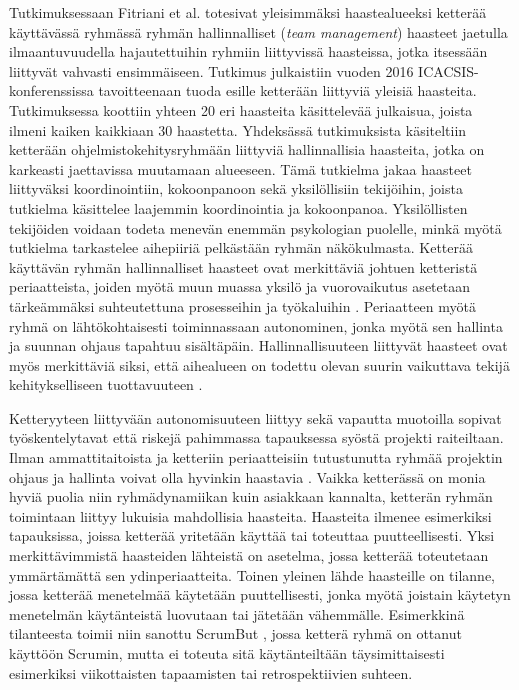 Tutkimuksessaan Fitriani et al. \cite{7872736} totesivat yleisimmäksi haastealueeksi ketterää käyttävässä ryhmässä ryhmän hallinnalliset (\textit{team management}) haasteet jaetulla ilmaantuvuudella hajautettuihin ryhmiin liittyvissä haasteissa, jotka itsessään liittyvät vahvasti ensimmäiseen. Tutkimus julkaistiin vuoden 2016 ICACSIS-konferenssissa tavoitteenaan tuoda esille ketterään liittyviä yleisiä haasteita. Tutkimuksessa koottiin yhteen 20 eri haasteita käsittelevää julkaisua, joista ilmeni kaiken kaikkiaan 30 haastetta. Yhdeksässä tutkimuksista käsiteltiin ketterään ohjelmistokehitysryhmään liittyviä hallinnallisia haasteita, jotka on karkeasti jaettavissa muutamaan alueeseen. Tämä tutkielma jakaa haasteet liittyväksi koordinointiin, kokoonpanoon sekä yksilöllisiin tekijöihin, joista tutkielma käsittelee laajemmin koordinointia ja kokoonpanoa. Yksilöllisten tekijöiden voidaan todeta menevän enemmän psykologian puolelle, minkä myötä tutkielma tarkastelee aihepiiriä pelkästään ryhmän näkökulmasta. Ketterää käyttävän ryhmän hallinnalliset haasteet ovat merkittäviä johtuen ketteristä periaatteista, joiden myötä muun muassa yksilö ja vuorovaikutus asetetaan tärkeämmäksi suhteutettuna prosesseihin ja työkaluihin \cite{beck2001agile}. Periaatteen myötä ryhmä on lähtökohtaisesti toiminnassaan autonominen, jonka myötä sen hallinta ja suunnan ohjaus tapahtuu sisältäpäin. Hallinnallisuuteen liittyvät haasteet ovat myös merkittäviä siksi, että aihealueen on todettu olevan suurin vaikuttava tekijä kehitykselliseen tuottavuuteen \cite{DEOMELO2013412}.

Ketteryyteen liittyvään autonomisuuteen liittyy sekä vapautta muotoilla sopivat työskentelytavat että riskejä pahimmassa tapauksessa syöstä projekti raiteiltaan. Ilman ammattitaitoista ja ketteriin periaatteisiin tutustunutta ryhmää projektin ohjaus ja hallinta voivat olla hyvinkin haastavia \cite{7872736}. Vaikka ketterässä on monia hyviä puolia niin ryhmädynamiikan kuin asiakkaan kannalta, ketterän ryhmän toimintaan liittyy lukuisia mahdollisia haasteita. Haasteita ilmenee esimerkiksi tapauksissa, joissa ketterää yritetään käyttää tai toteuttaa puutteellisesti. Yksi merkittävimmistä haasteiden lähteistä on asetelma, jossa ketterää toteutetaan ymmärtämättä sen ydinperiaatteita. Toinen yleinen lähde haasteille on tilanne, jossa ketterää menetelmää käytetään puuttellisesti, jonka myötä joistain käytetyn menetelmän käytänteistä luovutaan tai jätetään vähemmälle. Esimerkkinä tilanteesta toimii niin sanottu ScrumBut \cite{SCRUMBUT}, jossa ketterä ryhmä on ottanut käyttöön Scrumin, mutta ei toteuta sitä käytänteiltään täysimittaisesti esimerkiksi viikottaisten tapaamisten tai retrospektiivien suhteen.

